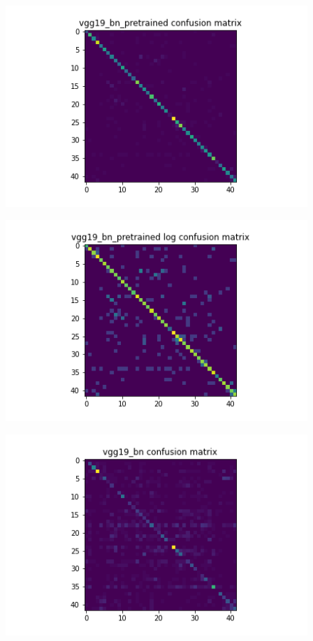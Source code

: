 \begin{figure}[H]

  \begin{minipage}[b]{.5\linewidth}
    \centering
    {\includegraphics[width=1.2\textwidth]{figs/conf_matrix/vgg19_bn_pretrained_conf.png}}
  \end{minipage}
  \hfill
  \begin{minipage}[b]{.5\linewidth}
    \centering
    {\includegraphics[width=1.2\textwidth]{figs/conf_matrix/vgg19_bn_pretrained_log_conf.png}}
  \end{minipage}
  \vfill
  \begin{minipage}[b]{.5\linewidth}
    \centering
    {\includegraphics[width=1.2\textwidth]{figs/conf_matrix/vgg19_bn_conf.png}}

\end{minipage}
\end{figure}
